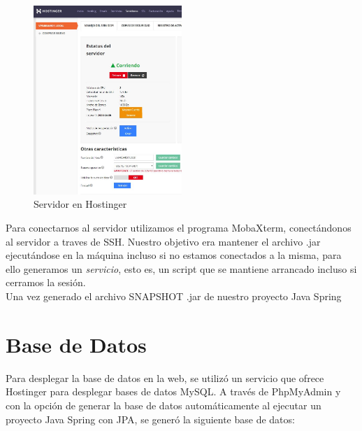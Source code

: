      \begin{figure}[h]
    \centering
     \includegraphics[width=0.5\textwidth]{images/servidorhostinger}
    \caption{Servidor en Hostinger}
    \end{figure}
    
    \FloatBarrier
    
    Para conectarnos al servidor utilizamos el programa MobaXterm, conectándonos al servidor a traves de SSH. Nuestro objetivo era mantener el archivo .jar ejecutándose en la máquina incluso si no estamos conectados a la misma, para ello generamos un \textit{servicio}, esto es, un script que se mantiene arrancado incluso si cerramos la sesión. \\
    \newline
    Una vez generado el archivo SNAPSHOT .jar de nuestro proyecto Java Spring 
    



    
    \section{Base de Datos}
    Para desplegar la base de datos en la web, se utilizó un servicio que ofrece Hostinger para desplegar bases de datos MySQL. 
    \newline 
    A través de PhpMyAdmin y con la opción de generar la base de datos automáticamente al ejecutar un proyecto Java Spring con JPA, se generó la siguiente base de datos:
    
